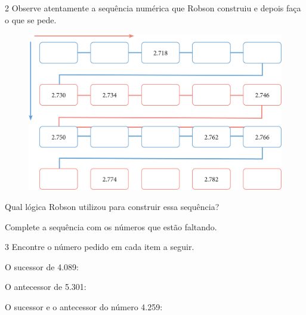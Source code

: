 \num{2} Observe atentamente a sequência numérica que Robson construiu e depois
faça o que se pede.

\begin{figure}[htpb!]
\centering
\includegraphics[width=.8\textwidth]{media/image17.png}
\end{figure}

\begin{escolha}
\item
  Qual lógica Robson utilizou para construir essa sequência?


\item
  Complete a sequência com os números que estão faltando.

\end{escolha}

\num{3} Encontre o número pedido em cada item a seguir.

\begin{escolha}
\item
  O sucessor de 4.089: 

\item
  O antecessor de 5.301: 

\item
  O sucessor e o antecessor do número 4.259: 
\end{escolha}


